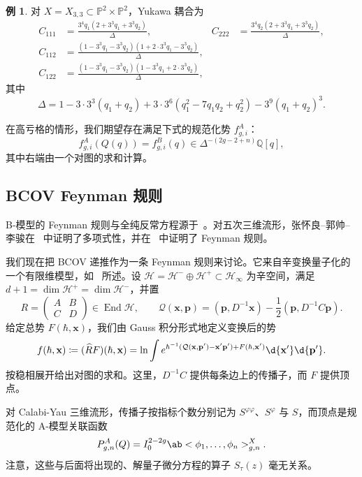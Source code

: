 \documentclass{amsart}
\theoremstyle{definition}
\newtheorem{exm}[thm]{例}
\theoremstyle{remark}
\theoremstyle{plain}
\theoremstyle{definition}
\theoremstyle{remark}
\newcommand{\Q}{\mathbb{Q}}
\renewcommand{\P}{\mathbb{P}}
\newcommand{\mc}[1]{\mathcal{#1}}
\newcommand{\mbf}[1]{\mathbf{#1}}
\newcommand{\bp}{\mbf{p}}
\newcommand{\wh}[1]{\widehat{#1}}
\newcommand{\1}{\mathbf{1}}
\newcommand{\2}{\mathbf{2}}
\newcommand{\3}{\mathbf{3}}
\DeclareMathOperator{\End}{End}
\begin{document}
\begin{exm}
    对 \(X = X_{3,3} \subset \P^2 \times \P^2\)，Yukawa 耦合为
    \begin{align*}
        C_{111} &= \frac{3^4 q_1 (2+3^3q_1+3^3q_2)}{\Delta}, & C_{222} &= \frac{3^4 q_2(2+3^3q_1+3^3q_2)}{\Delta}, \\
        C_{112} &= \frac{(1-3^3q_1-3^3q_2)(1+2\cdot 3^3 q_1 - 3^3 q_2)}{\Delta}, \\
        C_{122} &= \frac{(1-3^3q_1-3^3q_2)(1-3^3q_1+2\cdot3^3q_2)}{\Delta},
    \end{align*}
    其中
    \[ \Delta = 1 - 3\cdot3^3(q_1+q_2) + 3\cdot3^6(q_1^2 - 7q_1q_2+q_2^2) - 3^9(q_1+q_2)^3. \]
\end{exm}

在高亏格的情形，我们期望存在满足下式的规范化势 \(f^A_{g,i}\)：
\[ f^A_{g,i}(Q(q)) = f^B_{g,i}(q) \in \Delta^{-(2g-2+n)}\Q[q], \]
其中右端由一个对图的求和计算。

\subsection{BCOV Feynman 规则}%
\label{sub:The BCOV Feynman rule}

B-模型的 Feynman 规则与全纯反常方程源于~\cite{BCOV1994}。对五次三维流形，张怀良–郭帅–李骏在~\cite{CGL2021} 中证明了多项式性，并在~\cite{CGL2026} 中证明了 Feynman 规则。

我们现在把 BCOV 递推作为一条 Feynman 规则来讨论。它来自辛变换量子化的一个有限维模型，如~ 所述。设 \(\mc{H} = \mc{H}^- \oplus \mc{H}^+ \subset \mc{H}_{\infty}\) 为辛空间，满足 \(d+1 = \dim \mc{H}^+ = \dim \mc{H}^-\)，并置
\[ R = \begin{pmatrix} A & B \\ C & D \end{pmatrix} \in \End \mc{H}, \qquad \mc{Q}(\mbf{x},\bp) = (\bp, D^{-1}\mbf{x}) - \frac{1}{2}(\bp, D^{-1}C\bp). \]
给定总势 \(F(\hbar, \mbf{x})\)，我们由 Gauss 积分形式地定义变换后的势
\[ f(\hbar, \mbf{x}) \coloneqq (\wh{R}F)(\hbar,\mbf{x}) = \ln \int e^{\hbar^{-1}(\mc{Q}(\mbf{x},\bp') - \mbf{x}'\bp') + F(\hbar,\mbf{x}')}\d{\mbf{x}'}\d{\bp'}. \]
按稳相展开给出对图的求和。这里，\(D^{-1}C\) 提供每条边上的传播子，而 \(F\) 提供顶点。

对 Calabi-Yau 三维流形，传播子按指标个数分别记为 \(S^{\varphi\varphi}\)、\(S^{\varphi}\) 与 \(S\)，而顶点是规范化的 A-模型关联函数
\[ P^A_{g,n}(Q) = I_0^{2-2g}\ab<\phi_1, \ldots, \phi_n>^X_{g,n}. \]
注意，这些与后面将出现的、解量子微分方程的算子 \(S_{\tau}(z)\) 毫无关系。
\end{document}
